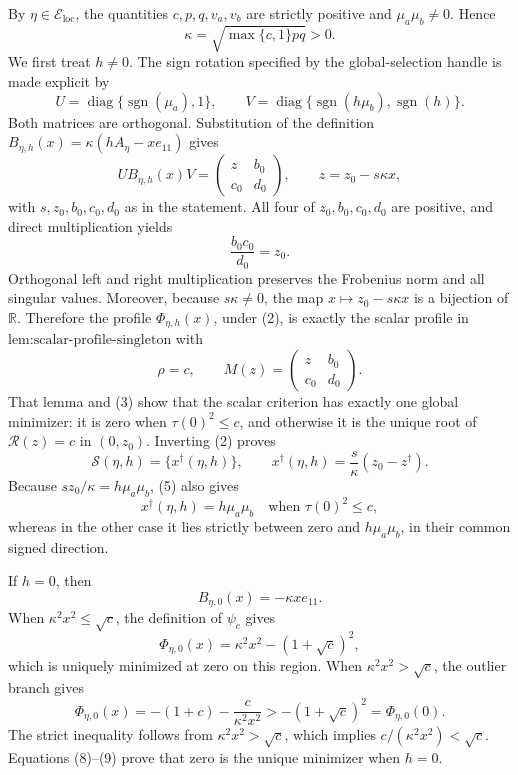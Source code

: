 By \(\eta\in\mathcal E_{\mathrm{loc}}\), the quantities \(c,p,q,v_a,v_b\) are strictly positive and \(\mu_a\mu_b\neq0\).  Hence
\[
\kappa=\sqrt{\max\{c,1\}pq}>0. \tag{1}
\]
We first treat \(h\neq0\).  The sign rotation specified by the global-selection handle is made explicit by
\[
U=\operatorname{diag}\{\operatorname{sgn}(\mu_a),1\},
\qquad
V=\operatorname{diag}\{\operatorname{sgn}(h\mu_b),
\operatorname{sgn}(h)\}.
\]
Both matrices are orthogonal.  Substitution of the definition
\(B_{\eta,h}(x)=\kappa(hA_\eta-xe_{11})\) gives
\[
UB_{\eta,h}(x)V
=\begin{pmatrix}z&b_0\\c_0&d_0\end{pmatrix},
\qquad z=z_0-s\kappa x, \tag{2}
\]
with \(s,z_0,b_0,c_0,d_0\) as in the statement.  All four of
\(z_0,b_0,c_0,d_0\) are positive, and direct multiplication yields
\[
\frac{b_0c_0}{d_0}=z_0. \tag{3}
\]
Orthogonal left and right multiplication preserves the Frobenius norm and all singular values.  Moreover, because \(s\kappa\neq0\), the map
\(x\mapsto z_0-s\kappa x\) is a bijection of \(\mathbb R\).  Therefore the profile \(\Phi_{\eta,h}(x)\), under (2), is exactly the scalar profile in \(\text{lem:scalar-profile-singleton}\) with
\[
\rho=c,\qquad M(z)=\begin{pmatrix}z&b_0\\c_0&d_0\end{pmatrix}. \tag{4}
\]
That lemma and (3) show that the scalar criterion has exactly one global minimizer: it is zero when \(\tau(0)^2\leq c\), and otherwise it is the unique root of \(\mathcal R(z)=c\) in \((0,z_0)\).  Inverting (2) proves
\[
\mathcal S(\eta,h)=\{x^\dagger(\eta,h)\},
\qquad
x^\dagger(\eta,h)=\frac{s}{\kappa}(z_0-z^\dagger). \tag{5}
\]
Because \(sz_0/\kappa=h\mu_a\mu_b\), (5) also gives
\[
x^\dagger(\eta,h)=h\mu_a\mu_b
\quad\text{when }\tau(0)^2\leq c, \tag{6}
\]
whereas in the other case it lies strictly between zero and
\(h\mu_a\mu_b\), in their common signed direction.

If \(h=0\), then
\[
B_{\eta,0}(x)=-\kappa xe_{11}. \tag{7}
\]
When \(\kappa^2x^2\leq\sqrt c\), the definition of \(\psi_c\) gives
\[
\Phi_{\eta,0}(x)=\kappa^2x^2-(1+\sqrt c)^2, \tag{8}
\]
which is uniquely minimized at zero on this region.  When
\(\kappa^2x^2>\sqrt c\), the outlier branch gives
\[
\Phi_{\eta,0}(x)=-(1+c)-\frac{c}{\kappa^2x^2}
>-(1+\sqrt c)^2=\Phi_{\eta,0}(0). \tag{9}
\]
The strict inequality follows from
\(\kappa^2x^2>\sqrt c\), which implies
\(c/(\kappa^2x^2)<\sqrt c\).  Equations (8)--(9) prove that zero is the unique minimizer when \(h=0\).

